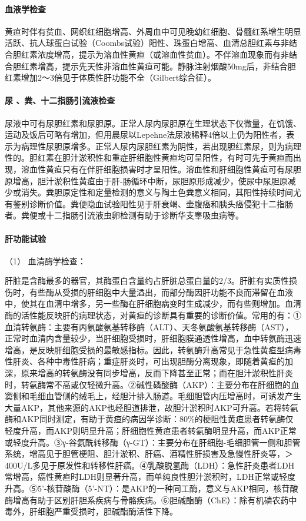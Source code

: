 \paragraph{血液学检查}

黄疸时伴有贫血、网织红细胞增高、外周血中可见晚幼红细胞、骨髓红系增生明显活跃、抗人球蛋白试验（Coombs试验）阳性、珠蛋白增高、血清总胆红素与非结合胆红素浓度增高，提示为溶血性黄疸（或溶血性贫血）。不伴溶血现象而有非结合胆红素增高，提示先天性非溶血性黄疸可能。静脉注射烟酸50mg后，非结合胆红素增加2～3倍见于体质性肝功能不全（Gilbert综合征）。

\paragraph{尿 、粪、十二指肠引流液检查}

尿液中可有尿胆红素和尿胆原。正常人尿内尿胆原在生理状态下仅微量，在饥饿、运动及饭后可略有增加，但用晨尿以Lepehne法尿液稀释4倍以上仍为阳性者，表示为病理性尿胆原增多。正常人尿内尿胆红素为阴性，若出现胆红素尿，则为病理性的。胆红素在胆汁淤积性和重症肝细胞性黄疸均可呈阳性，有时可先于黄疸而出现，溶血性黄疸只有在伴肝细胞损害时才呈阳性。溶血性和肝细胞性黄疸可有尿胆原增高，胆汁淤积性黄疸由于肝-肠循环中断，尿胆原形成减少，使尿中尿胆原减少或消失。粪胆原定性和定量检测的意义与陶土色粪意义相同，其阳性持续时间尤有鉴别诊断价值。粪便隐血试验阳性见于肝衰竭、壶腹癌和胰头癌侵犯十二指肠者。粪便或十二指肠引流液虫卵检测有助于诊断华支睾吸虫病等。

\paragraph{肝功能试验}

\hypertarget{text00039.htmlux5cux23CHP1-16-3-4-3-1}{}
（1） 血清酶学检查：

肝脏是含酶最多的器官，其酶蛋白含量约占肝脏总蛋白量的2/3。肝脏有实质性损伤时，有些酶从受损的肝细胞中大量溢出，而部分酶因肝功能不良而滞留在血液中，使其在血清中增多，另一些酶在肝细胞病变时生成减少，而有些则增加。血清酶的活性能反映肝的病理状态，对黄疸的诊断具有重要的诊断价值。常用的有：①血清转氨酶：主要有丙氨酸氨基转移酶（ALT）、天冬氨酸氨基转移酶（AST），正常时血清内含量较少，当肝细胞受损时，肝细胞膜通透性增高，血中转氨酶迅速增高，是反映肝细胞受损的最敏感指标。因此，转氨酶升高常见于急性黄疸型病毒性肝炎、各种中毒性肝病；重症肝炎时，可出现胆酶分离现象，即随着黄疸的加深，原来增高的转氨酶没有同步增高，反而下降甚至正常；而在胆汁淤积性肝炎时，转氨酶常不高或仅轻微升高。②碱性磷酸酶（AKP）：主要分布在肝细胞的血窦侧和毛细血管侧的绒毛上，经胆汁排入肠道。毛细胆管内压增高时，可诱发产生大量AKP，其他来源的AKP也经胆道排泄，故胆汁淤积时AKP可升高。若将转氨酶和AKP同时测定，有助于黄疸的病因学诊断：80\%的梗阻性黄疸患者转氨酶仅轻度升高，而AKP则明显升高；肝细胞性黄疸患者转氨酶明显升高，而AKP正常或轻度升高。③γ-谷氨酰转移酶（γ-GT）：主要分布在肝细胞-毛细胆管一侧和胆管系统，增高见于胆管梗阻、胆汁淤积、肝癌、酒精性肝损害及急慢性肝炎等，＞
400U/L多见于原发性和转移性肝癌。④乳酸脱氢酶（LDH）：急性肝炎患者LDH常增高，癌性黄疸时LDH则显著升高，而单纯良性胆汁淤积时，LDH正常或轻度升高。⑤5'{-}核苷酸酶（5'{-}NT）：是AKP的一种同工酶，意义与AKP相同，核苷酸酶增高有助于区别肝胆系疾病与骨骼疾病。⑥胆碱酯酶（ChE）：除有机磷农药中毒外，肝细胞严重受损时，胆碱酯酶活性下降。

